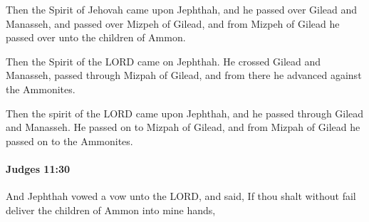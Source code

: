 			\begin{versebox}
					\item[BHS] 
					\item[ASV] Then the Spirit of Jehovah came upon Jephthah, and he passed over Gilead and Manasseh, and passed over Mizpeh of Gilead, and from Mizpeh of Gilead he passed over unto the children of Ammon.
					\item[NIV] Then the Spirit of the LORD came on Jephthah. He crossed Gilead and Manasseh, passed through Mizpah of Gilead, and from there he advanced against the Ammonites.
					\item[NRSV] Then the spirit of the LORD came upon Jephthah, and he passed through Gilead and Manasseh. He passed on to Mizpah of Gilead, and from Mizpah of Gilead he passed on to the Ammonites.
			\end{versebox}

		\paragraph{Judges 11:30} %
			\label{JUDGES-11-30}

			And Jephthah vowed a vow unto the LORD, and said, If thou shalt without fail deliver the children of Ammon into mine hands,

